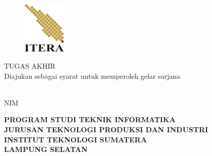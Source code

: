 \clearpage
\pagestyle{empty}
% 

\begin{center}
\smallskip

    \begin{figure}[h]
    	\centering
    	\includegraphics[width=2.1cm, height=2.5cm, keepaspectratio]{resources/itera-logo}
    \end{figure}

	\Large \bfseries \MakeUppercase{\thetitle}
	\vfill

    \Large \uppercase{Tugas Akhir}\\
    {\large \normalfont Diajukan sebagai syarat untuk memperoleh gelar sarjana}
    \vfill

    \large \normalfont \theauthor\\
    NIM \printnim
    \vfill

    \large \bfseries
    \uppercase{
        Program Studi Teknik Informatika \\
        Jurusan Teknologi Produksi dan Industri\\
        Institut Teknologi Sumatera\\
        Lampung Selatan
    }\medskip

    \thedate

\end{center}

\clearpage
